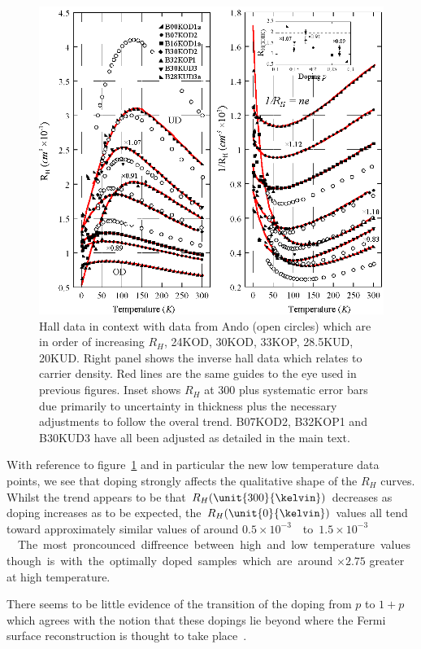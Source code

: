 \begin{figure}[htbp]
	\begin{center}
		\includegraphics[scale=1.1]{Chapter-HallBSCO/Figures/InvHallCombined/InvHallCombined}
		\caption{Hall data in context with data from Ando \etal\cite{Ando1999} (open circles) which are in order of increasing $R_H$, 24KOD, 30KOD, 33KOP, 28.5KUD, 20KUD. Right panel shows the inverse hall data which relates to carrier density. Red lines are the same guides to the eye used in previous figures. Inset shows $R_H$ at \unit{300}{\kelvin} plus systematic error bars due primarily to uncertainty in thickness plus the necessary adjustments to follow the overal trend. B07KOD2, B32KOP1 and B30KUD3 have all been adjusted as detailed in the main text.}
		\label{Fig:ExpH:InvHallCombined}
	\end{center}
\end{figure}

With reference to figure~\ref{Fig:ExpH:InvHallCombined} and in particular the new low temperature data points, we see that doping strongly affects the qualitative shape of the $R_H$ curves. Whilst the trend appears to be that $R_H(\unit{300}{\kelvin})$ decreases as doping increases as to be expected, the $R_H(\unit{0}{\kelvin})$ values all tend toward approximately similar values of around \unit{$0.5\times 10^{-3}$}{\centi\metre\cubed}to \unit{$1.5\times 10^{-3}$}{\centi\metre\cubed}. The most proncounced diffreence between high and low temperature values though is with the optimally doped samples which are around $\times 2.75$ greater at high temperature.

There seems to be little evidence of the transition of the doping from $p$ to $1+p$ which agrees with the notion that these dopings lie beyond where the Fermi surface reconstruction is thought to take place~\cite{LeBoeuf2007}. 




